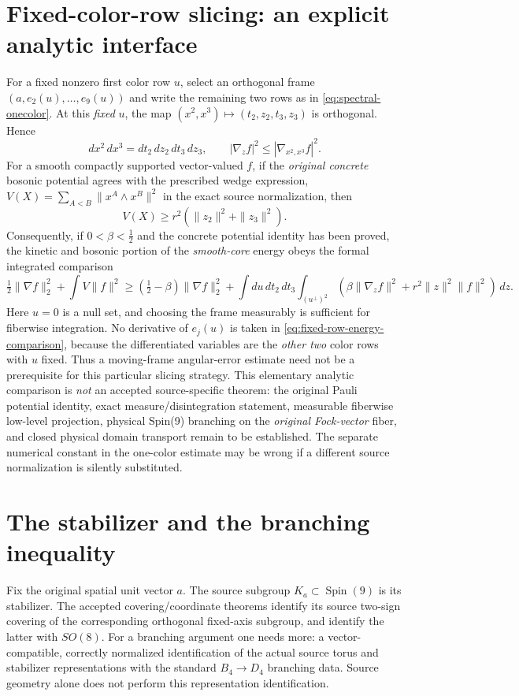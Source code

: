 \section{Fixed-color-row slicing: an explicit analytic interface}
\label{sec:fixed-color-slice}
For a fixed nonzero first color row $u$, select an orthogonal frame
$(a,e_2(u),\dots,e_9(u))$ and write the remaining two rows as in
\eqref{eq:spectral-onecolor}. At this \emph{fixed} $u$, the map
$(x^2,x^3)\mapsto(t_2,z_2,t_3,z_3)$ is orthogonal. Hence
\begin{equation}\label{eq:slice-jacobian}
  dx^2\,dx^3 =dt_2\,dz_2\,dt_3\,dz_3,\qquad
  |\nabla_z f|^2\le |\nabla_{x^2,x^3}f|^2.
\end{equation}
For a smooth compactly supported vector-valued $f$, if the \emph{original
concrete} bosonic potential agrees with the prescribed wedge expression,
$V(X)=\sum_{A<B}\|x^A\wedge x^B\|^2$ in the exact source
normalization, then
\begin{equation}\label{eq:slice-wedge}
 V(X)\ge r^2 (\|z_2\|^2+\|z_3\|^2).
\end{equation}
Consequently, if $0<\beta<\tfrac12$ and the concrete potential identity
has been proved, the kinetic and bosonic portion of the \emph{smooth-core}
energy obeys the formal integrated comparison
\begin{equation}\label{eq:fixed-row-energy-comparison}
 \tfrac12\|\nabla f\|_2^2+\int V\|f\|^2
 \ge (\tfrac12-\beta)\|\nabla f\|_2^2
 +\int\!du\,dt_2\,dt_3
   \int_{(u^\perp)^2}
   (\beta\|\nabla_z f\|^2+r^2\|z\|^2\|f\|^2)\,dz.
\end{equation}
Here $u=0$ is a null set, and choosing the frame measurably is sufficient
for fiberwise integration. No derivative of $e_j(u)$ is taken in
\eqref{eq:fixed-row-energy-comparison}, because the differentiated
variables are the \emph{other two} color rows with $u$ fixed.
Thus a moving-frame angular-error estimate need not be a prerequisite
for this particular slicing strategy. This elementary analytic comparison
is \emph{not} an accepted source-specific theorem: the original Pauli
potential identity, exact measure/disintegration statement, measurable
fiberwise low-level projection, physical Spin(9) branching on the
\emph{original Fock-vector} fiber, and closed physical domain transport
remain to be established. The separate numerical constant in the
one-color estimate may be wrong if a different source normalization is
silently substituted.

\section{The stabilizer and the branching inequality}
Fix the original spatial unit vector $a$. The source subgroup
$K_a\subset\operatorname{Spin}(9)$ is its stabilizer. The accepted
covering/coordinate theorems identify its source two-sign covering of
the corresponding orthogonal fixed-axis subgroup, and identify the
latter with $SO(8)$. For a branching argument one needs more:
a vector-compatible, correctly normalized identification of the
actual source torus and stabilizer representations with the standard
$B_4\to D_4$ branching data. Source geometry alone does not perform
this representation identification.

